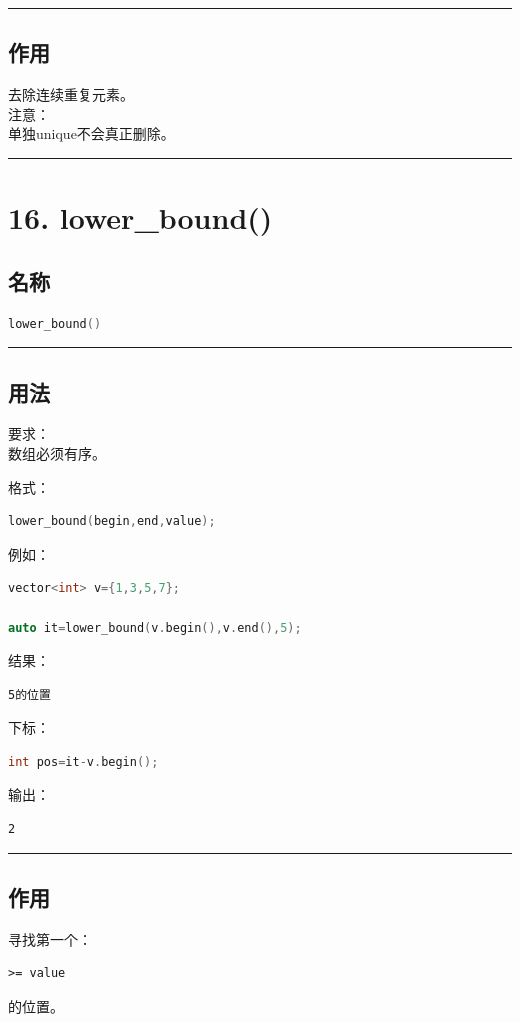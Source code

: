 \documentclass[9pt,twocolumn]{extarticle}
\begin{document}
\noindent\rule{\linewidth}{0.4pt}

\subsection{作用}
去除连续重复元素。\\
注意：\\
单独unique不会真正删除。

\noindent\rule{\linewidth}{0.4pt}

\section{16. lower\_bound()}

\subsection{名称}
\begin{lstlisting}[language=C++]
lower_bound()
\end{lstlisting}

\noindent\rule{\linewidth}{0.4pt}

\subsection{用法}
要求：\\
数组必须有序。

格式：
\begin{lstlisting}[language=C++]
lower_bound(begin,end,value);
\end{lstlisting}
例如：
\begin{lstlisting}[language=C++]
vector<int> v={1,3,5,7};

auto it=lower_bound(v.begin(),v.end(),5);
\end{lstlisting}
结果：
\begin{lstlisting}
5的位置
\end{lstlisting}
下标：
\begin{lstlisting}[language=C++]
int pos=it-v.begin();
\end{lstlisting}
输出：
\begin{lstlisting}
2
\end{lstlisting}

\noindent\rule{\linewidth}{0.4pt}

\subsection{作用}
寻找第一个：
\begin{lstlisting}
>= value
\end{lstlisting}
的位置。
\end{document}
